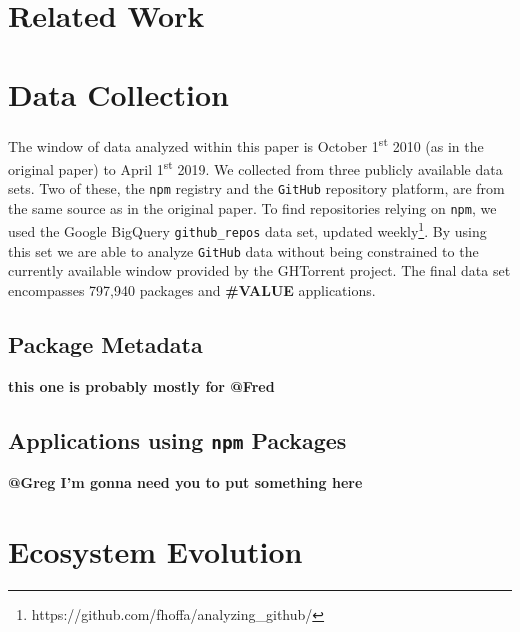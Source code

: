 \documentclass[10pt,conference]{IEEEtran}
\def\code#1{\texttt{#1}}
\begin{document}
\section{Related Work}


\section{Data Collection}
The window of data analyzed within this paper is October 1\textsuperscript{st} 2010 (as in the original paper) to April 1\textsuperscript{st} 2019.
We collected from three publicly available data sets. Two of these, the \code{npm} registry and the \code{GitHub} repository platform, are from the same source as in the original paper.
To find repositories relying on \code{npm}, we used the Google BigQuery \code{github\_repos} data set, updated weekly\footnote{https://github.com/fhoffa/analyzing\_github/}.
By using this set we are able to analyze \code{GitHub} data without being constrained to the currently available window provided by the GHTorrent project\cite{Gousi13}.
The final data set encompasses 797,940 packages and \textbf{\#VALUE} applications.

\subsection{Package Metadata}

\textbf{this one is probably mostly for @Fred}

\subsection{Applications using \code{npm} Packages}

\textbf{@Greg I'm gonna need you to put something here}

\section{Ecosystem Evolution}
\end{document}
